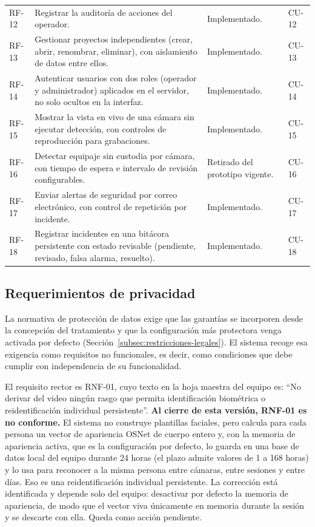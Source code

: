{\begin{longtable}{@{}L{1.3cm}L{6.6cm}L{4.2cm}L{1.9cm}@{}}
RF-12 & Registrar la auditoría de acciones del operador. & Implementado. & CU-12 \\
RF-13 & Gestionar proyectos independientes (crear, abrir, renombrar, eliminar), con aislamiento de datos entre ellos. & Implementado. & CU-13 \\
RF-14 & Autenticar usuarios con dos roles (operador y administrador) aplicados en el servidor, no solo ocultos en la interfaz. & Implementado. & CU-14 \\
RF-15 & Mostrar la vista en vivo de una cámara sin ejecutar detección, con controles de reproducción para grabaciones. & Implementado. & CU-15 \\
RF-16 & Detectar equipaje sin custodia por cámara, con tiempo de espera e intervalo de revisión configurables. & Retirado del prototipo vigente. & CU-16 \\
RF-17 & Enviar alertas de seguridad por correo electrónico, con control de repetición por incidente. & Implementado. & CU-17 \\
RF-18 & Registrar incidentes en una bitácora persistente con estado revisable (pendiente, revisado, falsa alarma, resuelto). & Implementado. & CU-18 \\
\end{longtable}
}

\subsection{Requerimientos de privacidad}
\label{subsec:privacidad}

La normativa de protección de datos exige que las garantías se incorporen desde la
concepción del tratamiento y que la configuración más protectora venga activada por defecto
(Sección~\ref{subsec:restricciones-legales}). El sistema recoge esa exigencia como requisitos no
funcionales, es decir, como condiciones que debe cumplir con independencia de su
funcionalidad.

El requisito rector es RNF-01, cuyo texto en la hoja maestra del equipo es: \enquote{No derivar
del video ningún rasgo que permita identificación biométrica o reidentificación individual
persistente}. \textbf{Al cierre de esta versión, RNF-01 es no conforme.} El sistema no construye
plantillas faciales, pero calcula para cada persona un vector de apariencia OSNet de cuerpo
entero y, con la memoria de apariencia activa, que es la configuración por defecto, lo guarda en
una base de datos local del equipo durante 24 horas (el plazo admite valores de 1 a 168 horas) y
lo usa para reconocer a la misma persona entre cámaras, entre sesiones y entre días. Eso es una
reidentificación individual persistente. La corrección está identificada y depende solo del
equipo: desactivar por defecto la memoria de apariencia, de modo que el vector viva
únicamente en memoria durante la sesión y se descarte con ella. Queda como acción pendiente.

